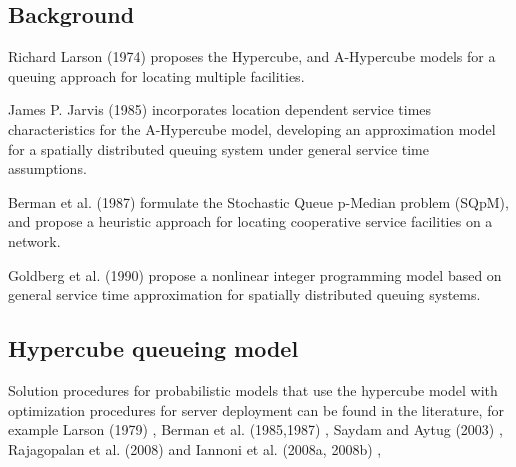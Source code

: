 
\subsection{Background}
\begin{frame}[allowframebreaks]
  Richard Larson (1974) \cite{larson1974hypercube,larson1975approximating}
  proposes the Hypercube, and A-Hypercube models
  for a queuing approach for locating multiple facilities.

  James P. Jarvis (1985) \cite{jarvis1985approximating} incorporates
  location dependent service times characteristics for the A-Hypercube model,
  developing an approximation model for a spatially distributed queuing system
  under general service time assumptions.

  Berman et al. (1987) \cite{berman1987stochastic}
  formulate the Stochastic Queue p-Median problem (SQpM),
  and propose a heuristic approach for locating cooperative service facilities
  on a network.

  Goldberg et al. (1990) \cite{goldberg1990validating}
  propose a nonlinear integer programming model
  based on general service time approximation
  for spatially distributed queuing systems.

\end{frame}

\subsection{Hypercube queueing model}
\begin{frame}
Solution procedures for probabilistic models that use the hypercube model
with optimization procedures 
for server deployment can be found in the literature, for example
Larson (1979) \cite{larson1978structural}, 
Berman et al. (1985,1987) \cite{berman1985optimal,berman1987stochastic}, 
Saydam and Aytug (2003) \cite{saydam2003accurate}, 
Rajagopalan et al. (2008) \cite{rajagopalan2008multiperiod} and 
Iannoni et al. (2008a, 2008b) \cite{iannoni2008hypercube,iannoni2009optimization},
\end{frame}
